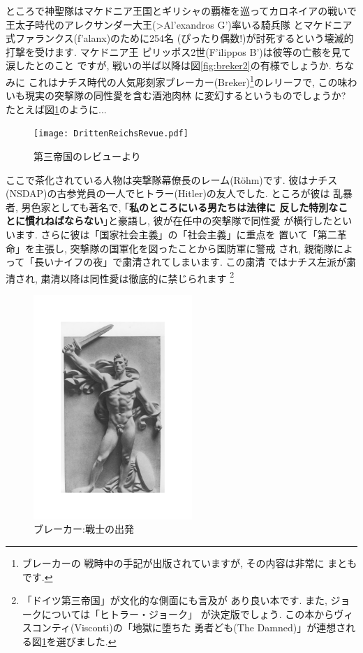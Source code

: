 ところで神聖隊はマケドニア王国とギリシャの覇権を巡ってカロネイアの戦いで
王太子時代のアレクサンダー大王(\textgreek{>Al'exandros G'})率いる騎兵隊
とマケドニア式ファランクス(\textgreek{f'alanx})のために254名
(ぴったり偶数!)が討死するという壊滅的打撃を受けます. マケドニア王
ピリッポス2世(\textgreek{F'ilippos B'})は彼等の亡骸を見て涙したとのこと
ですが, 戦いの半ば以降は図\ref{fig:breker2}の有様でしょうか. ちなみに
これはナチス時代の人気彫刻家ブレーカー(Breker)\footnote{ブレーカーの
戦時中の手記\cite{ブレーカー}が出版されていますが, その内容は非常に
まともです.}のレリーフで, この味わいも現実の突撃隊の同性愛を含む酒池肉林
に変幻するというものでしょうか? たとえば図\ref{fig:rrevue}のように...

\begin{figure}[htbp]
\begin{center}
\texttt{[image: DrittenReichsRevue.pdf]}
\caption{第三帝国のレビューより\cite{関}}
\label{fig:rrevue}
\end{center}
\end{figure}

ここで茶化されている人物は突撃隊幕僚長のレーム(R\"ohm)です. 彼はナチス
(NSDAP)の古参党員の一人でヒトラー(Hitler)の友人でした. ところが彼は
乱暴者, 男色家としても著名で, ｢\textbf{私のところにいる男たちは法律に
反した特別なことに慣れねばならない}｣と豪語し, 彼が在任中の突撃隊で同性愛
が横行したといいます. さらに彼は「国家社会主義」の「社会主義」に重点を
置いて「第二革命」を主張し, 突撃隊の国軍化を図ったことから国防軍に警戒
され, 親衛隊によって「長いナイフの夜」で粛清されてしまいます. この粛清
ではナチス左派が粛清され, 粛清以降は同性愛は徹底的に禁じられます
\footnote{「ドイツ第三帝国」\cite{クラーザー}が文化的な側面にも言及が
あり良い本です. また, ジョークについては「ヒトラー・ジョーク」\cite{関}
が決定版でしょう. この本からヴィスコンティ(Visconti)の「地獄に堕ちた
勇者ども(The Damned)」が連想される図\ref{fig:rrevue}を選びました.}
\newpage

\begin{figure}
\includegraphics[width=6cm]{Breker2_relief.pdf}
\caption{ブレーカー:戦士の出発}
\label{fig:breker1}
\end{figure}

